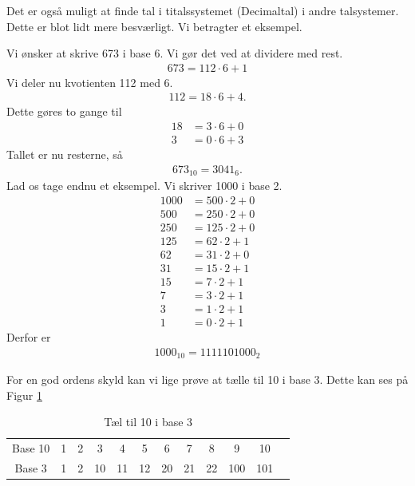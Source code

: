 Det er også muligt at finde tal i titalssystemet (Decimaltal) i andre talsystemer. Dette er blot lidt mere besværligt. Vi betragter et eksempel.

\begin{exa}
	Vi ønsker at skrive 673 i base 6. Vi gør det ved at dividere med rest.
	\begin{align*}
		673 = 112 \cdot 6 + 1
	\end{align*}
	Vi deler nu kvotienten 112 med 6.
	\begin{align*}
		112 = 18\cdot 6 + 4.
	\end{align*}
	Dette gøres to gange til
	\begin{align*}
		18 &= 3 \cdot 6 + 0\\
		3 &= 0 \cdot 6 + 3
	\end{align*}
	Tallet er nu resterne, så 
	\begin{align*}
		673_{10} = 3041_{6}.
	\end{align*}
	Lad os tage endnu et eksempel. 
	Vi skriver 1000 i base 2.
	\begin{align*}
		1000 &= 500\cdot 2 + 0\\
		500 &= 250 \cdot 2 + 0\\
		250 &= 125 \cdot 2 + 0\\
		125 &= 62 \cdot 2 + 1\\
		62 &= 31\cdot 2 + 0\\
		31 &= 15\cdot 2 + 1\\
		15 &= 7\cdot 2 + 1\\
		7 &= 3\cdot 2 + 1\\
		3 &= 1\cdot 2 + 1\\
		1 &= 0\cdot 2 + 1
	\end{align*}
	Derfor er 
	\begin{align*}
		1000_{10} = 1111101000_{2}
	\end{align*}	
\end{exa}

For en god ordens skyld kan vi lige prøve at tælle til 10 i base 3. Dette kan ses på Figur \ref{fig:base3}
\begin{table}[H]
	\centering
	\begin{tabular}{c|ccccccccccc}
		Base 10&1&2&3&4&5&6&7&8&9&10 \\
		Base 3&1&2&10&11&12&20&21&22&100&101
	\end{tabular}
	\caption{Tæl til 10 i base 3}
	\label{fig:base3}
\end{table}

